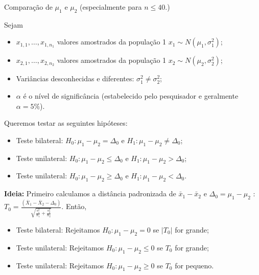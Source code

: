 \documentclass[9pt]{beamer}
\begin{document}
\begin{frame}{Comparação de $\mu_1$ e $\mu_2$ (especialmente para $n \leq 40$.)}

\small

Sejam
\begin{itemize}
	\item $x_{1,1}, \dots, x_{1, n_1}$ valores amostrados da população 1 $x_1 \sim N(\mu_1, \sigma_1^2)$;
	\item $x_{2,1}, \dots, x_{2, n_2}$ valores amostrados da população 1 $x_2 \sim N(\mu_2, \sigma_2^2)$;
	\item Variâncias desconhecidas e diferentes: $\sigma_1^2 \neq \sigma_2^2$;
	\item $\alpha$ é o nível de significância (estabelecido pelo pesquisador e geralmente $\alpha=5\%$). 
\end{itemize}
\vfill

Queremos testar as seguintes hipóteses:
\begin{itemize}
	\item Teste bilateral: $H_0: \mu_1 - \mu_2 = \Delta_0$ e $H_1: \mu_1 - \mu_2 \neq \Delta_0$;
	\item Teste unilateral: $H_0: \mu_1 - \mu_2 \leq \Delta_0$ e $H_1: \mu_1 - \mu_2 > \Delta_0$;
	\item Teste unilateral: $H_0: \mu_1 - \mu_2 \geq \Delta_0$ e $H_1: \mu_1 - \mu_2 < \Delta_0$.
\end{itemize}
\vfill

\textbf{Ideia:} Primeiro calculamos a distância padronizada de $\bar{x}_1 - \bar{x}_2$ e $\Delta_0=\mu_1 - \mu_2$ : $T_0 = \frac{(\bar{X}_1 - \bar{X}_2 - \Delta_0)}{\sqrt{\frac{s_1^2}{n_1} + \frac{s_2^2}{n_2}}}$. Então, 
\begin{itemize}
	\item Teste bilateral: Rejeitamos $H_0: \mu_1 - \mu_2 =0$ se $\lvert T_0 \rvert$ for grande;
	\item Teste unilateral: Rejeitamos $H_0: \mu_1 - \mu_2 \leq 0$ se $T_0 $ for grande;
	\item Teste unilateral: Rejeitamos $H_0: \mu_1 - \mu_2 \geq 0$ se $T_0 $ for pequeno.
\end{itemize}

\normalsize
\end{frame}
\end{document}
